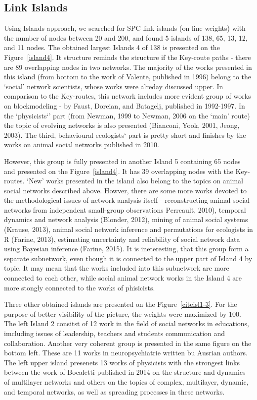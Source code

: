 \documentclass[11pt]{article} %
\begin{document}
\subsection{Link Islands}

Using Islands approach, we searched for SPC link islands (on line weights) with the number of nodes between 20 and 200, and found 5 islands of 138, 65, 13, 12, and 11 nodes. The obtained largest Islands 4 of 138 is presented on the Figure~\ref{island4}. It structure reminds the structure if the Key-route paths - there are 89 overlapping nodes in two networks. The majority of the works presented in this island (from bottom to the work of Valente, published in 1996) belong to the `social' network scientists, whose works were alreday discussed upper. In comparison to the Key-routes, this network includes more evident group of works on blockmodeling - by Faust, Doreian, and Batagelj, published in 1992-1997. In the `physicists`' part (from Newman, 1999 to Newman, 2006 on the `main' route) the topic of evolving networks is also presented (Bianconi, Yook, 2001, Jeong, 2003). The third, behavioural ecologists` part is pretty short and finishes by the works on animal social networks published in 2010.  \medskip   

However, this group is fully presented in another Island 5 containing 65 nodes and presented on the Figure~\ref{island4}. It has 39 overlapping nodes with the Key-routes. `New' works presented in the island also belong to the topics on animal social networks described above. Howver, there are some more works devoted to the methodological issues of network analysis itself -  reconstructing animal social networks from independent small-group observations Perreault, 2010), temporal dynamics and network analysis (Blonder, 2012), mining of animal social systems (Krause, 2013), animal social network inference and permutations for ecologists in R  (Farine, 2013), estimating uncertainty and reliability of social network data using Bayesian inference (Farine, 2015). It is ineteresting, that this group form a separate subnetwork, even though it is connected to the upper part of Island 4 by topic. It may mean that the works included into this subnetwork are more connected to each other, while social animal network works in the Island 4 are more stongly connected to the works of phisicists.  \medskip   

Three other obtained islands are presented on the Figure~\ref{citeisl1-3}. For the purpose of better visibility of the picture, the weights were maximized by 100. The left Island 2 consitst of 12 work in the field of social networks in educations, imcluding issues of leadership, teachers and students communication and collaboration. Another very coherent group is presented in the same figure on the bottom left. These are 11 works in neuropsychiatrie written bu Ausrian authors. The left upper island presenets 13 works of physicists with the strongest links between the work of Bocaletti published in 2014 on the structure and dynamics of multilayer networks and others on the topics of complex, multilayer, dynamic, and temporal networks, as well as spreading processes in these networks.  \medskip    
\end{document}
